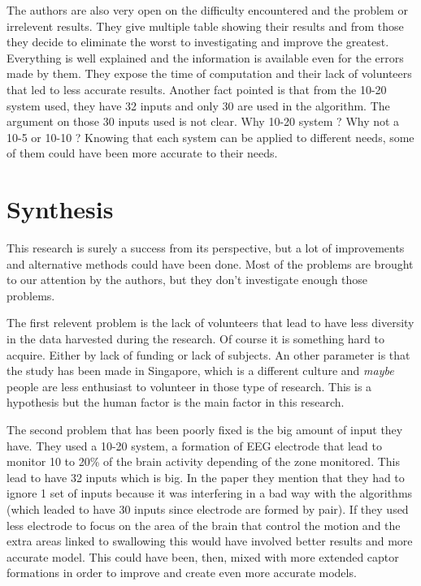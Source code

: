 \documentclass[a4paper, 12pt, english]{article}
\begin{document}
The authors are also very open on the difficulty encountered and the problem or irrelevent results. They give multiple table showing their results and from those they decide to eliminate the worst to investigating and improve the greatest. Everything is well explained and the information is available even for the errors made by them. They expose the time of computation and their lack of volunteers that led to less accurate results. Another fact pointed is that from the 10-20 system used, they have 32 inputs and only 30 are used in the algorithm. The argument on those 30 inputs used is not clear. Why 10-20 system ? Why not a 10-5 or 10-10 ? Knowing that each system can be applied to different needs, some of them could have been more accurate to their needs.

\section{Synthesis}
This research is surely a success from its perspective, but a lot of improvements and alternative methods could have been done. Most of the problems are brought to our attention by the authors, but they don't investigate enough those problems.

The first relevent problem is the lack of volunteers that lead to have less diversity in the data harvested during the research. Of course it is something hard to acquire. Either by lack of funding or lack of subjects. An other parameter is that the study has been made in Singapore, which is a different culture and \textit{maybe} people are less enthusiast to volunteer in those type of research. This is a hypothesis but the human factor is the main factor in this research. 

The second problem that has been poorly fixed is the big amount of input they have. 
They used a 10-20 system, a formation of EEG electrode that lead to monitor 10 to 20\% of the brain activity depending of the zone monitored. This lead to have 32 inputs which is big. In the paper they mention that they had to ignore 1 set of inputs because it was interfering in a bad way with the algorithms (which leaded to have 30 inputs since electrode are formed by pair).
If they used less electrode to focus on the area of the brain that control the motion and the extra areas linked to swallowing this would have involved better results and more accurate model. This could have been, then, mixed with more extended captor formations in order to improve and create even more accurate models.
\end{document}
